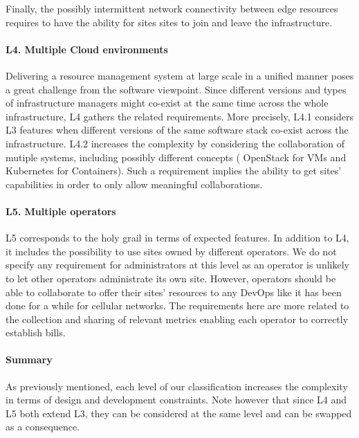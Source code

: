 Finally, the possibly intermittent network connectivity between edge resources
requires to have the ability for sites sites to join and leave the
infrastructure.


\paragraph{L4. Multiple Cloud environments}
Delivering a resource management system at large scale in a unified manner %
poses a great challenge from the software viewpoint. Since different versions and types
of infrastructure managers might co-exist at the same time across the whole
infrastructure, L4 gathers the related requirements.
%
More precisely, L4.1 considers L3 features when different versions of the same software stack co-exist across the infrastructure.
%
L4.2 increases the complexity by considering  the collaboration of mutiple systems, including possibly different concepts (\eg
OpenStack for VMs and Kubernetes for Containers).
%
Such a requirement implies the ability to get sites' capabilities in order to
only allow meaningful collaborations.

\paragraph{L5. Multiple operators}
L5 corresponds to the holy grail in terms of expected features. In addition to
L4, it includes the possibility to use sites owned by different operators. %
We do not specify any requirement for
administrators at this level as an operator is unlikely to let other operators administrate
its own site. However, operators should be able to collaborate to offer their
sites' resources to any DevOps like it has been done for a while for cellular
networks. The requirements here are more related to the collection and sharing of
relevant metrics enabling each operator to correctly establish bills.

\paragraph{Summary}
As previously mentioned, each level of our classification increases the
complexity in terms of design and development constraints. Note however that
since L4 and L5 both extend L3, they can be considered at the same level and
can be swapped as a consequence.

